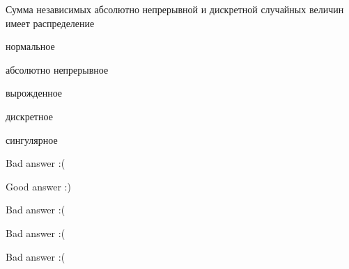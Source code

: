 
\begin{question}
Сумма независимых абсолютно непрерывной и дискретной случайных величин
имеет распределение
\begin{answerlist}
  \item нормальное
  \item абсолютно непрерывное
  \item вырожденное
  \item дискретное
  \item сингулярное
\end{answerlist}
\end{question}

\begin{solution}
\begin{answerlist}
  \item Bad answer :(
  \item Good answer :)
  \item Bad answer :(
  \item Bad answer :(
  \item Bad answer :(
\end{answerlist}
\end{solution}

